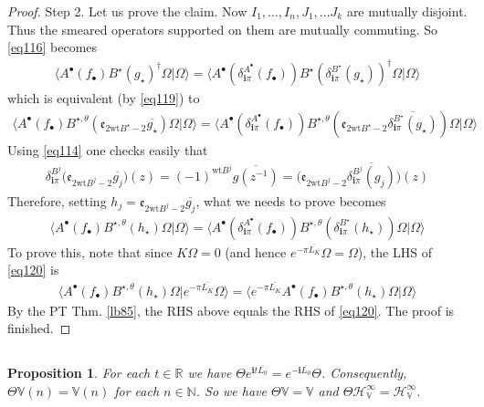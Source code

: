 \documentclass[12pt,b5paper,notitlepage]{article}
\theoremstyle{definition}
\theoremstyle{plain}
\newtheorem{pp}[df]{Proposition}
\newcommand{\ovl}{\overline}
\newcommand{\bk}[1]{\langle {#1}\rangle}
\newcommand{\im}{\mathbf{i}}
\newcommand{\blt}{\bullet}
\newcommand{\Vbb}{\mathbb V}
\newcommand{\Nbb}{\mathbb N}
\newcommand{\Rbb}{\mathbb R}
\newcommand{\wt}{\mathrm{wt}}
\newcommand{\HV}{\mathcal H_{\mathbb V}}
\newcommand{\ek}{\mathfrak{e}}
\numberwithin{equation}{section}
\begin{document}
\begin{proof}
Step 2. Let us prove the claim. Now $I_1,\dots,I_n,J_1,\dots J_k$ are mutually disjoint. Thus the smeared operators supported on them are mutually commuting. So \eqref{eq116} becomes
\begin{align*}
\bk{A^\blt(f_\blt)B^\star(g_\star)^\dagger\Omega|\Omega}=\bk{A^\blt(\delta_{\im\pi}^{A^\blt}(f_\blt))B^\star(\delta^{B^\star}_{\im\pi}(g_\star))^\dagger\Omega|\Omega}
\end{align*}
which is equivalent (by \eqref{eq119}) to
\begin{align*}
\bk{A^\blt(f_\blt)B^{\star,\theta}(\ek_{2\wt B^\star-2} \ovl{g_\star})\Omega|\Omega}=\bk{A^\blt(\delta_{\im\pi}^{A^\blt}(f_\blt))B^{\star,\theta}(\ek_{2\wt B^\star-2}\ovl{\delta^{B^\star}_{\im\pi}(g_\star)})\Omega|\Omega}
\end{align*}
Using \eqref{eq114} one checks easily that
\begin{align*}
\delta^{B^j}_{\im\pi}\big(\ek_{2\wt B^j-2} \ovl{g_j}\big)(z)=(-1)^{\wt B^j}\ovl {g(z^{-1})}=\big(\ek_{2\wt B^j-2}\ovl{\delta^{B^j}_{\im\pi}(g_j)}\big)(z)
\end{align*}
Therefore, setting $h_j=\ek_{2\wt B^j-2} \ovl{g_j}$, what we needs to prove becomes
\begin{align*}
\bk{A^\blt(f_\blt)B^{\star,\theta}(h_\star)\Omega|\Omega}=\bk{A^\blt(\delta_{\im\pi}^{A^\blt}(f_\blt))B^{\star,\theta}(\delta_{\im\pi}^{B^\star}(h_\star))\Omega|\Omega}   \tag{$\heartsuit$}\label{eq120}
\end{align*}
To prove this, note that since $K\Omega=0$ (and hence $e^{-\pi \ovl{L_K}}\Omega=\Omega$), the LHS of \eqref{eq120} is
\begin{align*}
\bk{A^\blt(f_\blt)B^{\star,\theta}(h_\star)\Omega|e^{-\pi \ovl{L_K}}\Omega}=\bk{e^{-\pi \ovl{L_K}}A^\blt(f_\blt)B^{\star,\theta}(h_\star)\Omega|\Omega}
\end{align*}
By the PT Thm. \ref{lb85}, the RHS above equals the RHS of \eqref{eq120}. The proof is finished.
\end{proof}


\subsection{}


\begin{pp}\label{lb87}
For each $t\in\Rbb$ we have $\Theta e^{\im t\ovl{L_0}}=e^{-\im\ovl{L_0}}\Theta$. Consequently, $\Theta\Vbb(n)=\Vbb(n)$ for each $n\in\Nbb$. So we have $\Theta\Vbb=\Vbb$ and $\Theta\HV^\infty=\HV^\infty$.
\end{pp}
\end{document}

